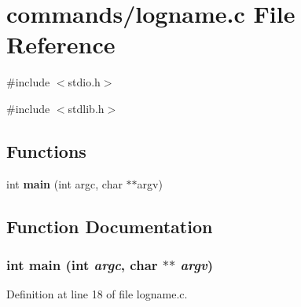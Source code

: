 \section{commands/logname.c File Reference}
\label{logname_8c}
{\ttfamily \#include $<$stdio.h$>$}\par
{\ttfamily \#include $<$stdlib.h$>$}\par
\subsection*{Functions}
\begin{DoxyCompactItemize}
\item 
int {\bf main} (int argc, char $\ast$$\ast$argv)
\end{DoxyCompactItemize}


\subsection{Function Documentation}
\subsubsection[{main}]{\setlength{\rightskip}{0pt plus 5cm}int main (int {\em argc}, \/  char $\ast$$\ast$ {\em argv})}\label{logname_8c_a3c04138a5bfe5d72780bb7e82a18e627}


Definition at line 18 of file logname.c.

